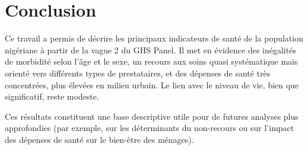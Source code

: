 \documentclass[
  11pt,
]{article}
\begin{document}
\section{Conclusion}\label{conclusion}

Ce travail a permis de décrire les principaux indicateurs de santé de la
population nigériane à partir de la vague 2 du GHS Panel. Il met en
évidence des inégalités de morbidité selon l'âge et le sexe, un recours
aux soins quasi systématique mais orienté vers différents types de
prestataires, et des dépenses de santé très concentrées, plus élevées en
milieu urbain. Le lien avec le niveau de vie, bien que significatif,
reste modeste.

Ces résultats constituent une base descriptive utile pour de futures
analyses plus approfondies (par exemple, sur les déterminants du
non-recours ou sur l'impact des dépenses de santé sur le bien-être des
ménages).
\end{document}
